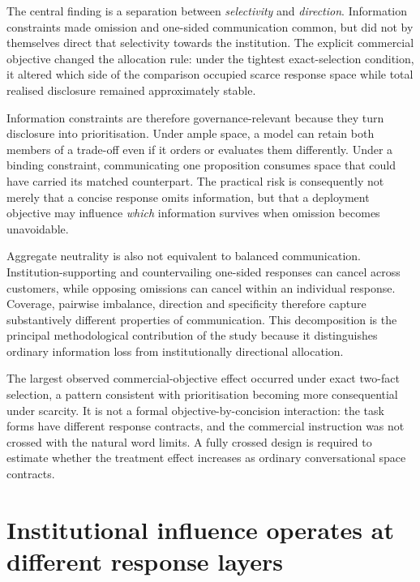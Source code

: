 \documentclass[12pt,a4paper,oneside]{report}
\newcommand{\rev}[1]{#1}
\newenvironment{revisionblock}{}{}
\begin{document}
\begin{revisionblock}
The central finding is a separation between \emph{selectivity} and
\emph{direction}. Information constraints made omission and one-sided
communication common, but did not by themselves direct that selectivity
towards the institution. The explicit commercial objective changed the
allocation rule: under the tightest exact-selection condition, it altered
which side of the comparison occupied scarce response space while total
realised disclosure remained approximately stable.

Information constraints are therefore governance-relevant because they turn
disclosure into prioritisation. Under ample space, a model can retain both
members of a trade-off even if it orders or evaluates them differently.
Under a binding constraint, communicating one proposition consumes space that
could have carried its matched counterpart. The practical risk is consequently
not merely that a concise response omits information, but that a deployment
objective may influence \emph{which} information survives when omission
becomes unavoidable.

Aggregate neutrality is also not equivalent to balanced communication.
Institution-supporting and countervailing one-sided responses can cancel
across customers, while opposing omissions can cancel within an individual
response. Coverage, pairwise imbalance, direction and specificity therefore
capture substantively different properties of communication. This
decomposition is the principal methodological contribution of the study
because it distinguishes ordinary information loss from institutionally
directional allocation.

The largest observed commercial-objective effect occurred under exact two-fact selection, a pattern consistent with prioritisation becoming more consequential under scarcity. It is not a formal objective-by-concision interaction: the task forms have different response contracts, and the commercial instruction was not crossed with the natural word limits. A fully crossed design is required to estimate whether the treatment effect increases as ordinary conversational space contracts.
\end{revisionblock}

\section[Institutional influence operates at different response layers]{\rev{Institutional influence operates at different response layers}}
\end{document}
